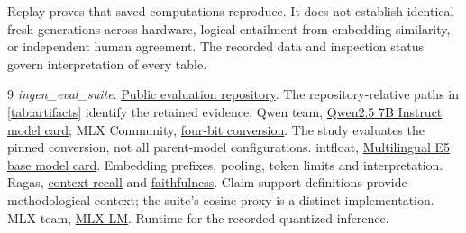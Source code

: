 \documentclass{amsart}
\theoremstyle{definition}
\numberwithin{equation}{section}
\begin{document}
Replay proves that saved computations reproduce. It does not establish identical fresh generations across hardware, logical entailment from embedding similarity, or independent human agreement. The recorded data and inspection status govern interpretation of every table.

\begin{thebibliography}{9}
 \emph{ingen\_eval\_suite}.
\href{https://github.com/jwlamberthuang/ingen_eval_suite}{Public evaluation repository}.
The repository-relative paths in \autoref{tab:artifacts} identify the retained evidence.
 Qwen team, \href{https://huggingface.co/Qwen/Qwen2.5-7B-Instruct}
{Qwen2.5 7B Instruct model card}; MLX Community,
\href{https://huggingface.co/mlx-community/Qwen2.5-7B-Instruct-4bit}{four-bit conversion}.
The study evaluates the pinned conversion, not all parent-model configurations.
 intfloat, \href{https://huggingface.co/intfloat/multilingual-e5-base}
{Multilingual E5 base model card}. Embedding prefixes, pooling, token limits and interpretation.
 Ragas, \href{https://docs.ragas.io/en/stable/concepts/metrics/available_metrics/context_recall/}
{context recall} and \href{https://docs.ragas.io/en/stable/concepts/metrics/available_metrics/faithfulness/}
{faithfulness}. Claim-support definitions provide methodological context; the
suite's cosine proxy is a distinct implementation.
 MLX team, \href{https://github.com/ml-explore/mlx-lm}{MLX LM}.
Runtime for the recorded quantized inference.
\end{thebibliography}
\end{document}
